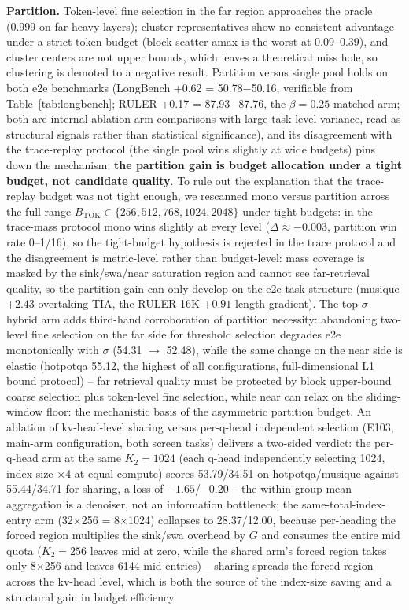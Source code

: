 \documentclass[11pt]{article}
\begin{document}
\textbf{Partition.} Token-level fine selection in the far region approaches the oracle (0.999 on far-heavy layers); cluster representatives show no consistent advantage under a strict token budget (block scatter-amax is the worst at 0.09--0.39), and cluster centers are not upper bounds, which leaves a theoretical miss hole, so clustering is demoted to a negative result. Partition versus single pool holds on both e2e benchmarks (LongBench +0.62 = 50.78$-$50.16, verifiable from Table~\ref{tab:longbench}; RULER +0.17 = 87.93$-$87.76, the $\beta{=}0.25$ matched arm; both are internal ablation-arm comparisons with large task-level variance, read as structural signals rather than statistical significance), and its disagreement with the trace-replay protocol (the single pool wins slightly at wide budgets) pins down the mechanism: \textbf{the partition gain is budget allocation under a tight budget, not candidate quality}. To rule out the explanation that the trace-replay budget was not tight enough, we rescanned mono versus partition across the full range $B_{\mathrm{TOK}}\in\{256,512,768,1024,2048\}$ under tight budgets: in the trace-mass protocol mono wins slightly at every level ($\Delta\approx-0.003$, partition win rate 0--1/16), so the tight-budget hypothesis is rejected in the trace protocol and the disagreement is metric-level rather than budget-level: mass coverage is masked by the sink/swa/near saturation region and cannot see far-retrieval quality, so the partition gain can only develop on the e2e task structure (musique $+2.43$ overtaking TIA, the RULER 16K $+0.91$ length gradient). The top-$\sigma$ hybrid arm adds third-hand corroboration of partition necessity: abandoning two-level fine selection on the far side for threshold selection degrades e2e monotonically with $\sigma$ (54.31 $\rightarrow$ 52.48), while the same change on the near side is elastic (hotpotqa 55.12, the highest of all configurations, full-dimensional L1 bound protocol) -- far retrieval quality must be protected by block upper-bound coarse selection plus token-level fine selection, while near can relax on the sliding-window floor: the mechanistic basis of the asymmetric partition budget. An ablation of kv-head-level sharing versus per-q-head independent selection (E103, main-arm configuration, both screen tasks) delivers a two-sided verdict: the per-q-head arm at the same $K_2{=}1024$ (each q-head independently selecting 1024, index size $\times$4 at equal compute) scores 53.79/34.51 on hotpotqa/musique against 55.44/34.71 for sharing, a loss of $-1.65$/$-0.20$ -- the within-group mean aggregation is a denoiser, not an information bottleneck; the same-total-index-entry arm (32$\times$256 = 8$\times$1024) collapses to 28.37/12.00, because per-heading the forced region multiplies the sink/swa overhead by $G$ and consumes the entire mid quota ($K_2{=}256$ leaves mid at zero, while the shared arm's forced region takes only 8$\times$256 and leaves 6144 mid entries) -- sharing spreads the forced region across the kv-head level, which is both the source of the index-size saving and a structural gain in budget efficiency.
\end{document}
